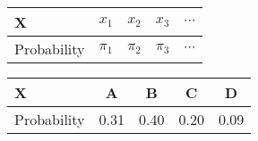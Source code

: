 \begin{tabular} {l |c c c c} 
\toprule
X & $x_1$ & $x_2$ & $x_3$ & $\cdots$ \\ \midrule
Probability & $\pi_1$ & $\pi_2$ & $\pi_3$ & $\cdots $ \\ \toprule
\end{tabular}

\begin{tabular} {l |c c c c} 
\toprule
X & A  & B  & C & D  \\ \midrule
Probability & 0.31 & 0.40 & 0.20 & 0.09 \\ \toprule
\end{tabular}
